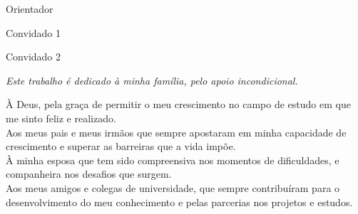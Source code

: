 \begin{folhadeaprovacao}
  		\par
\vspace*{1.0cm}     


  	 \centering Orientador
  		
  		
  		  \centering Convidado 1
  		
  		
  		  \centering Convidado 2
  		
  		 
   \begin{center}
    \vspace*{0.1cm}
    {\large\imprimirlocal}
    \par
    {\large\imprimirdata}
    \vspace*{0.5cm}
  \end{center}
  
\end{folhadeaprovacao}

\begin{dedicatoria}
   \vspace*{\fill}
   \centering
   \noindent
   \textit{ Este trabalho é dedicado à minha família, pelo apoio incondicional.} \vspace*{\fill}
\end{dedicatoria}

\begin{agradecimentos}
À Deus, pela graça de permitir o meu crescimento no campo de estudo em que me sinto feliz e realizado. \\

Aos meus pais e meus irmãos que sempre apostaram em minha capacidade de crescimento e superar as barreiras que a vida impõe.\\

À minha esposa que tem sido compreensiva nos momentos de dificuldades, e companheira nos desafios que surgem.\\

Aos meus amigos e colegas de universidade, que sempre contribuíram para o desenvolvimento do meu conhecimento e pelas parcerias nos projetos e estudos.


\end{agradecimentos}

